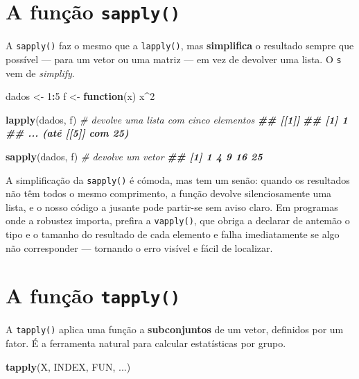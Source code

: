 \documentclass[
  portuguese,
  11pt,
  openany]{book}
\newenvironment{Shaded}{\begin{snugshade}}{\end{snugshade}}
\newcommand{\CommentTok}[1]{\textcolor[rgb]{0.56,0.35,0.01}{\textit{#1}}}
\newcommand{\ControlFlowTok}[1]{\textcolor[rgb]{0.13,0.29,0.53}{\textbf{#1}}}
\newcommand{\DecValTok}[1]{\textcolor[rgb]{0.00,0.00,0.81}{#1}}
\newcommand{\DocumentationTok}[1]{\textcolor[rgb]{0.56,0.35,0.01}{\textbf{\textit{#1}}}}
\newcommand{\FunctionTok}[1]{\textcolor[rgb]{0.13,0.29,0.53}{\textbf{#1}}}
\newcommand{\NormalTok}[1]{#1}
\newcommand{\OtherTok}[1]{\textcolor[rgb]{0.56,0.35,0.01}{#1}}
\newcommand{\SpecialCharTok}[1]{\textcolor[rgb]{0.81,0.36,0.00}{\textbf{#1}}}
\begin{document}
\section{\texorpdfstring{A função \texttt{sapply()}}{A função sapply()}}\label{a-funuxe7uxe3o-sapply}

A \texttt{sapply()} faz o mesmo que a \texttt{lapply()}, mas \textbf{simplifica} o resultado sempre que
possível --- para um vetor ou uma matriz --- em vez de devolver uma lista. O \texttt{s} vem de
\emph{simplify}.

\begin{Shaded}
\begin{Highlighting}[]
\NormalTok{dados }\OtherTok{\textless{}{-}} \DecValTok{1}\SpecialCharTok{:}\DecValTok{5}
\NormalTok{f }\OtherTok{\textless{}{-}} \ControlFlowTok{function}\NormalTok{(x) x}\SpecialCharTok{\^{}}\DecValTok{2}

\FunctionTok{lapply}\NormalTok{(dados, f)     }\CommentTok{\# devolve uma lista com cinco elementos}
\DocumentationTok{\#\# [[1]]}
\DocumentationTok{\#\# [1] 1}
\DocumentationTok{\#\# ... (até [[5]] com 25)}

\FunctionTok{sapply}\NormalTok{(dados, f)     }\CommentTok{\# devolve um vetor}
\DocumentationTok{\#\# [1]  1  4  9 16 25}
\end{Highlighting}
\end{Shaded}

A simplificação da \texttt{sapply()} é cómoda, mas tem um senão: quando os resultados não
têm todos o mesmo comprimento, a função devolve silenciosamente uma lista, e o nosso
código a jusante pode partir-se sem aviso claro. Em programas onde a robustez importa,
prefira a \texttt{vapply()}, que obriga a declarar de antemão o tipo e o tamanho do
resultado de cada elemento e falha imediatamente se algo não corresponder --- tornando
o erro visível e fácil de localizar.

\section{\texorpdfstring{A função \texttt{tapply()}}{A função tapply()}}\label{a-funuxe7uxe3o-tapply}

A \texttt{tapply()} aplica uma função a \textbf{subconjuntos} de um vetor, definidos por um fator.
É a ferramenta natural para calcular estatísticas por grupo.

\begin{Shaded}
\begin{Highlighting}[]
\FunctionTok{tapply}\NormalTok{(X, INDEX, FUN, ...)}
\end{Highlighting}
\end{Shaded}
\end{document}
